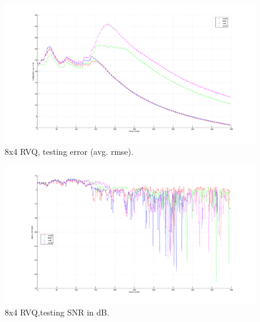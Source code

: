 								\begin{figure}[h!]
								\centering
								\includegraphics[height=0.4\textheight]{thesis/4_trellis70_8_4_1000_tst_armse.pdf}
								\caption{8x4 RVQ, testing error (avg. rmse).}
								\label{fig:4_trellis70_8_4_1000_tst_armse}
								\end{figure}

								\begin{figure}[h!]
								\centering
								\includegraphics[height=0.4\textheight]{thesis/4_trellis70_8_4_1000_tst_SNRdB.pdf}
								\caption{8x4 RVQ,testing SNR in dB.}
								\label{fig:4_trellis70_8_4_1000_tst_SNRdB}
								\end{figure}
